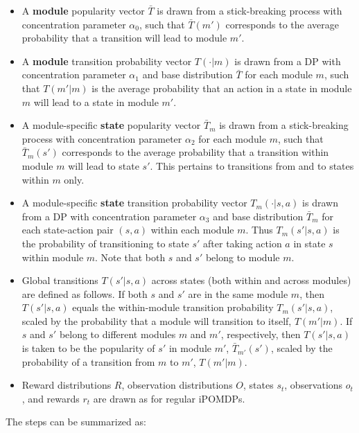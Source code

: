 \documentclass[11pt]{article}
\begin{document}
\begin{itemize}
\item A \textbf{module} popularity vector $\bar{T}$ is drawn from a stick-breaking process with concentration parameter $\alpha_0$, such that $\bar{T}(m')$ corresponds to the average probability that a transition will lead to module $m'$.
\item A \textbf{module} transition probability vector $T(\cdot | m)$ is drawn from a DP with concentration parameter $\alpha_1$ and base distribution $\bar{T}$ for each module $m$, such that $T(m'|m)$ is the average probability that an action in a state in module $m$ will lead to a state in module $m'$.
\item A module-specific \textbf{state} popularity vector $\bar{T}_{m}$ is drawn from a stick-breaking process with concentration parameter $\alpha_2$ for each module $m$, such that $\bar{T}_m(s')$ corresponds to the average probability that a transition within module $m$ will lead to state $s'$. This pertains to transitions from and to states within $m$ only.
\item A module-specific \textbf{state} transition probability vector $T_m(\cdot|s,a)$ is drawn from a DP with concentration parameter $\alpha_3$ and base distribution $\bar{T}_{m}$ for each state-action pair $(s,a)$ within each module $m$. Thus $T_m(s'|s,a)$ is the probability of transitioning to state $s'$ after taking action $a$ in state $s$ within module $m$. Note that both $s$ and $s'$ belong to module $m$.
\item Global transitions $T(s'|s,a)$ across states (both within and across modules) are defined as follows. If both $s$ and $s'$ are in the same module $m$, then $T(s'|s,a)$ equals the within-module transition probability $T_m(s'|s,a)$, scaled by the probability that a module will transition to itself, $T(m'|m)$. If $s$ and $s'$ belong to different modules $m$ and $m'$, respectively, then $T(s'|s,a)$ is taken to be the popularity of $s'$ in module $m'$, $\bar{T}_{m'}(s')$, scaled by the probability of a transition from $m$ to $m'$, $T(m'|m)$.
\item Reward distributions $R$, observation distributions $O$, states $s_t$, observations $o_t$, and rewards $r_t$ are drawn as for regular iPOMDPs.
\end{itemize}

The steps can be summarized as:
\end{document}
